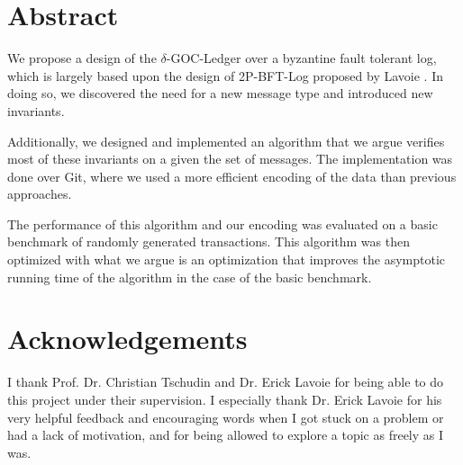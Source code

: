 \chapter*{Abstract}
We propose a design of the $\delta$-GOC-Ledger \cite{delta-goc-ledger-heisch} over a byzantine fault tolerant log, which is largely based upon the design of 2P-BFT-Log proposed by Lavoie \cite{2p-bft-log}. In doing so, we discovered the need for a new message type and introduced new invariants.

Additionally, we designed and implemented an algorithm that we argue verifies most of these invariants on a given the set of messages. The implementation was done over Git, where we used a more efficient encoding of the data than previous approaches.

The performance of this algorithm and our encoding was evaluated on a basic benchmark of randomly generated transactions.
This algorithm was then optimized with what we argue is an optimization that improves the asymptotic running time of the algorithm in the case of the basic benchmark.

\chapter*{Acknowledgements}
I thank Prof. Dr. Christian Tschudin and Dr. Erick Lavoie for being able to do this project under their supervision. I especially thank Dr. Erick Lavoie for his very helpful feedback and encouraging words when I got stuck on a problem or had a lack of motivation, and for being allowed to explore a topic as freely as I was.
